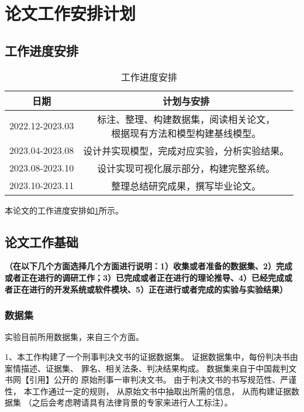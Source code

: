 \section{论文工作安排计划}

\subsection{工作进度安排}

\begin{table}[h]
    \centering
    \begin{tabular}{|c|c|}
        \hline
        \textbf{日期}   & \textbf{计划与安排}                                 \\
        \hline
        2022.12-2023.03 & \makecell[c]{标注、整理、构建数据集，阅读相关论文， \\根据现有方法和模型构建基线模型。}\\
        \hline
        2023.04-2023.08 & 设计并实现模型，完成对应实验，分析实验结果。        \\
        \hline
        2023.08-2023.10 & 设计实现可视化展示部分，构建完整系统。              \\
        \hline
        2023.10-2023.11 & 整理总结研究成果，撰写毕业论文。                    \\
        \hline
    \end{tabular}
    \caption{工作进度安排}
    \label{plan1}
\end{table}

本论文的工作进度安排如\cref{plan1}所示。
\subsection{论文工作基础}
\textbf{\color{red}（在以下几个方面选择几个方面进行说明：1）收集或者准备的数据集、2）完成或者正在进行的调研工作；3）已完成或者正在进行的理论推导、4）已经完成或者正在进行的开发系统或软件模块、5）正在进行或者完成的实验与实验结果）}

\subsubsection{数据集}
实验目前所用数据集，来自三个方面。

1、本工作构建了一个刑事判决文书的证据数据集。
证据数据集中，每份判决书由案情描述、证据集、
罪名、相关法条、判决结果构成。
数据集来自于中国裁判文书网【引用】公开的
原始刑事一审判决文书。
由于判决文书的书写规范性、严谨性，
本工作通过一定的规则，
从原始文书中抽取出所需的信息，
从而构建证据数据集
（之后会考虑聘请具有法律背景的专家来进行人工标注）。

